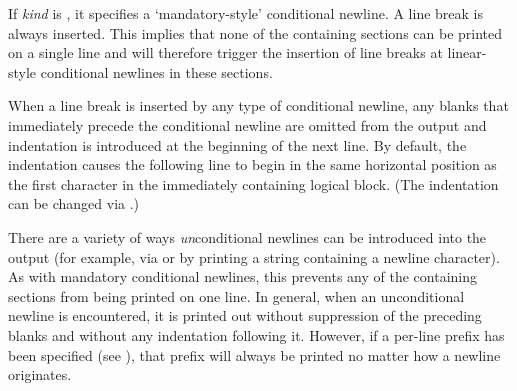 \begin{defun}[Function]
If \emph{kind} is , it specifies a `mandatory-style' conditional
newline.  A line break is always inserted.  This implies that none of the
containing sections can be printed on a single line and will therefore
trigger the insertion of line breaks at linear-style conditional newlines
in these sections.

When a line break is inserted by any type of conditional newline, any
blanks that immediately precede the conditional newline are omitted from
the output and indentation is introduced at the beginning of the next line.
By default, the indentation causes the following line to begin in the same
horizontal position as the first character in the immediately containing
logical block.  (The indentation can be changed via .)

There are a variety of ways \emph{un\/}conditional newlines can be introduced into
the output (for example, via  or by printing a string containing a newline
character).  As with mandatory conditional newlines, this prevents any of
the containing sections from being printed on one line.  In general, when
an unconditional newline is encountered, it is printed out without
suppression of the preceding blanks and without any indentation following
it.  However, if a per-line prefix has been specified (see
), that prefix will always be printed no matter how a
newline originates.
\end{defun}

